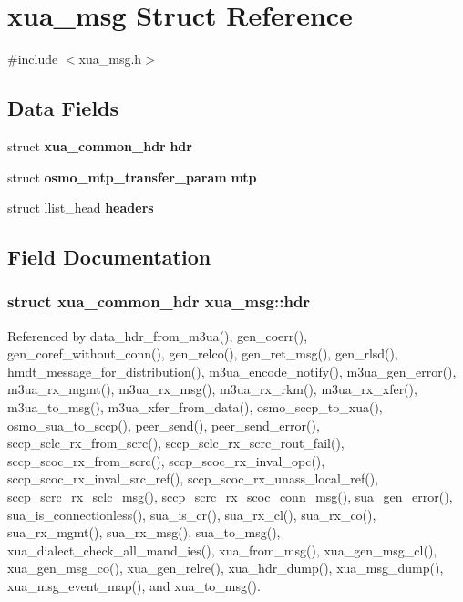 \section{xua\+\_\+msg Struct Reference}
\label{structxua__msg}


{\ttfamily \#include $<$xua\+\_\+msg.\+h$>$}

\subsection*{Data Fields}
\begin{DoxyCompactItemize}
\item 
struct {\bf xua\+\_\+common\+\_\+hdr} {\bf hdr}
\item 
struct {\bf osmo\+\_\+mtp\+\_\+transfer\+\_\+param} {\bf mtp}
\item 
struct llist\+\_\+head {\bf headers}
\end{DoxyCompactItemize}


\subsection{Field Documentation}
\subsubsection[{hdr}]{\setlength{\rightskip}{0pt plus 5cm}struct {\bf xua\+\_\+common\+\_\+hdr} xua\+\_\+msg\+::hdr}\label{structxua__msg_ab7a0fbf5fecd1c4fa64606460192a42d}


Referenced by data\+\_\+hdr\+\_\+from\+\_\+m3ua(), gen\+\_\+coerr(), gen\+\_\+coref\+\_\+without\+\_\+conn(), gen\+\_\+relco(), gen\+\_\+ret\+\_\+msg(), gen\+\_\+rlsd(), hmdt\+\_\+message\+\_\+for\+\_\+distribution(), m3ua\+\_\+encode\+\_\+notify(), m3ua\+\_\+gen\+\_\+error(), m3ua\+\_\+rx\+\_\+mgmt(), m3ua\+\_\+rx\+\_\+msg(), m3ua\+\_\+rx\+\_\+rkm(), m3ua\+\_\+rx\+\_\+xfer(), m3ua\+\_\+to\+\_\+msg(), m3ua\+\_\+xfer\+\_\+from\+\_\+data(), osmo\+\_\+sccp\+\_\+to\+\_\+xua(), osmo\+\_\+sua\+\_\+to\+\_\+sccp(), peer\+\_\+send(), peer\+\_\+send\+\_\+error(), sccp\+\_\+sclc\+\_\+rx\+\_\+from\+\_\+scrc(), sccp\+\_\+sclc\+\_\+rx\+\_\+scrc\+\_\+rout\+\_\+fail(), sccp\+\_\+scoc\+\_\+rx\+\_\+from\+\_\+scrc(), sccp\+\_\+scoc\+\_\+rx\+\_\+inval\+\_\+opc(), sccp\+\_\+scoc\+\_\+rx\+\_\+inval\+\_\+src\+\_\+ref(), sccp\+\_\+scoc\+\_\+rx\+\_\+unass\+\_\+local\+\_\+ref(), sccp\+\_\+scrc\+\_\+rx\+\_\+sclc\+\_\+msg(), sccp\+\_\+scrc\+\_\+rx\+\_\+scoc\+\_\+conn\+\_\+msg(), sua\+\_\+gen\+\_\+error(), sua\+\_\+is\+\_\+connectionless(), sua\+\_\+is\+\_\+cr(), sua\+\_\+rx\+\_\+cl(), sua\+\_\+rx\+\_\+co(), sua\+\_\+rx\+\_\+mgmt(), sua\+\_\+rx\+\_\+msg(), sua\+\_\+to\+\_\+msg(), xua\+\_\+dialect\+\_\+check\+\_\+all\+\_\+mand\+\_\+ies(), xua\+\_\+from\+\_\+msg(), xua\+\_\+gen\+\_\+msg\+\_\+cl(), xua\+\_\+gen\+\_\+msg\+\_\+co(), xua\+\_\+gen\+\_\+relre(), xua\+\_\+hdr\+\_\+dump(), xua\+\_\+msg\+\_\+dump(), xua\+\_\+msg\+\_\+event\+\_\+map(), and xua\+\_\+to\+\_\+msg().

